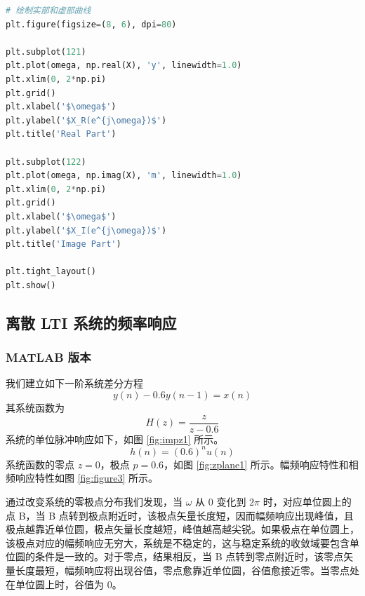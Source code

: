\documentclass[12pt,AutoFakeBold]{article}
\begin{document}
\begin{lstlisting}[language=Python]
# 绘制实部和虚部曲线
plt.figure(figsize=(8, 6), dpi=80)

plt.subplot(121)
plt.plot(omega, np.real(X), 'y', linewidth=1.0)
plt.xlim(0, 2*np.pi)
plt.grid()
plt.xlabel('$\omega$')
plt.ylabel('$X_R(e^{j\omega})$')
plt.title('Real Part')

plt.subplot(122)
plt.plot(omega, np.imag(X), 'm', linewidth=1.0)
plt.xlim(0, 2*np.pi)
plt.grid()
plt.xlabel('$\omega$')
plt.ylabel('$X_I(e^{j\omega})$')
plt.title('Image Part')

plt.tight_layout()
plt.show()
\end{lstlisting}

\subsection{离散 LTI 系统的频率响应}

\subsubsection{MATLAB 版本} \label{sec:matlab2}

我们建立如下一阶系统差分方程
%
\begin{equation*}
y(n)-0.6y(n-1)=x(n)
\end{equation*}
%
其系统函数为
\begin{equation*}
H(z)=\frac{z}{z-0.6}
\end{equation*}
系统的单位脉冲响应如下，如图 \ref{fig:impz1} 所示。
\begin{equation*}
h(n)=(0.6)^nu(n)
\end{equation*}
系统函数的零点 $z=0$，极点 $p=0.6$，如图 \ref{fig:zplane1} 所示。幅频响应特性和相频响应特性如图 \ref{fig:figure3} 所示。

通过改变系统的零极点分布我们发现，当 $\omega$ 从 $0$ 变化到 $2\pi$ 时，对应单位圆上的点 B，当 B 点转到极点附近时，该极点矢量长度短，因而幅频响应出现峰值，且极点越靠近单位圆，极点矢量长度越短，峰值越高越尖锐。如果极点在单位圆上，该极点对应的幅频响应无穷大，系统是不稳定的，这与稳定系统的收敛域要包含单位圆的条件是一致的。对于零点，结果相反，当 B 点转到零点附近时，该零点矢量长度最短，幅频响应将出现谷值，零点愈靠近单位圆，谷值愈接近零。当零点处在单位圆上时，谷值为 0。
\end{document}

